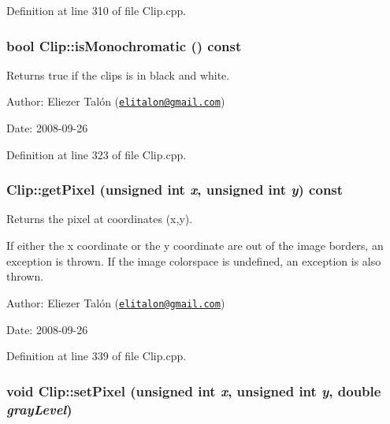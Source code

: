 Definition at line 310 of file Clip.cpp.\hypertarget{class_clip_5045f79876d4299b54803d56b26d5f75}{
\subsubsection[isMonochromatic]{\setlength{\rightskip}{0pt plus 5cm}bool Clip::isMonochromatic () const}}
\label{class_clip_5045f79876d4299b54803d56b26d5f75}


Returns true if the clips is in black and white. 

\begin{Desc}
\item[Author:]Eliezer Talón (\href{mailto:elitalon@gmail.com}{\tt elitalon@gmail.com}) \end{Desc}
\begin{Desc}
\item[Date:]2008-09-26 \end{Desc}


Definition at line 323 of file Clip.cpp.\hypertarget{class_clip_74eded11c0dcbd2b10b453074cbb8b84}{
\subsubsection[getPixel]{ Clip::getPixel (unsigned int {\em x}, \/  unsigned int {\em y}) const}}
\label{class_clip_74eded11c0dcbd2b10b453074cbb8b84}


Returns the pixel at coordinates (x,y). 

If either the x coordinate or the y coordinate are out of the image borders, an exception is thrown. If the image colorspace is undefined, an exception is also thrown.

\begin{Desc}
\item[Author:]Eliezer Talón (\href{mailto:elitalon@gmail.com}{\tt elitalon@gmail.com}) \end{Desc}
\begin{Desc}
\item[Date:]2008-09-26 \end{Desc}


Definition at line 339 of file Clip.cpp.\hypertarget{class_clip_3c48493242de7453438ed0e8d0ea74df}{
\subsubsection[setPixel]{\setlength{\rightskip}{0pt plus 5cm}void Clip::setPixel (unsigned int {\em x}, \/  unsigned int {\em y}, \/  double {\em grayLevel})}}
\label{class_clip_3c48493242de7453438ed0e8d0ea74df}



